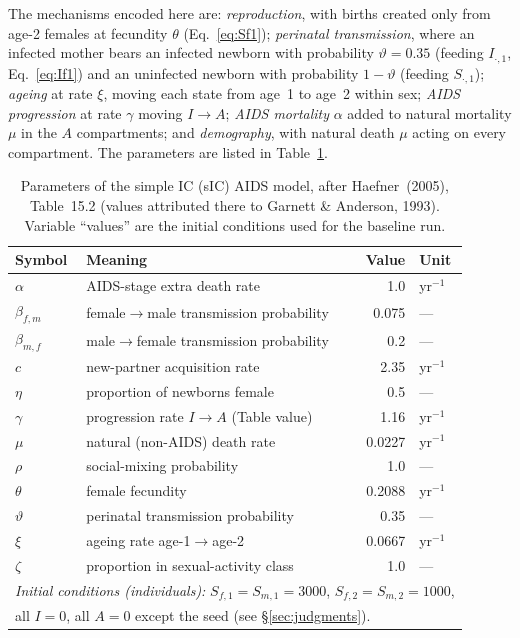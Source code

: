 The mechanisms encoded here are: \emph{reproduction}, with births created only from
age-2 females at fecundity $\theta$ (Eq.~\ref{eq:Sf1}); \emph{perinatal
transmission}, where an infected mother bears an infected newborn with probability
$\vartheta=0.35$ (feeding $I_{\cdot,1}$, Eq.~\ref{eq:If1}) and an uninfected
newborn with probability $1-\vartheta$ (feeding $S_{\cdot,1}$); \emph{ageing} at
rate $\xi$, moving each state from age~1 to age~2 within sex; \emph{AIDS
progression} at rate $\gamma$ moving $I\to A$; \emph{AIDS mortality} $\alpha$ added
to natural mortality $\mu$ in the $A$ compartments; and \emph{demography}, with
natural death $\mu$ acting on every compartment. The parameters are listed in
Table~\ref{tab:sic-params}.

\begin{table}[t]
\centering
\caption{Parameters of the simple IC (sIC) AIDS model, after Haefner~(2005),
Table~15.2 (values attributed there to Garnett \& Anderson, 1993). Variable
``values'' are the initial conditions used for the baseline run.}
\label{tab:sic-params}
\begin{tabular}{llrl}
\toprule
Symbol & Meaning & {Value} & Unit \\
\midrule
$\alpha$        & AIDS-stage extra death rate                 & 1.0    & yr$^{-1}$ \\
$\beta_{f,m}$   & female$\to$male transmission probability    & 0.075  & --- \\
$\beta_{m,f}$   & male$\to$female transmission probability     & 0.2    & --- \\
$c$             & new-partner acquisition rate                 & 2.35   & yr$^{-1}$ \\
$\eta$          & proportion of newborns female                & 0.5    & --- \\
$\gamma$        & progression rate $I\to A$ (Table value)      & 1.16   & yr$^{-1}$ \\
$\mu$           & natural (non-AIDS) death rate                & 0.0227 & yr$^{-1}$ \\
$\rho$          & social-mixing probability                    & 1.0    & --- \\
$\theta$        & female fecundity                             & 0.2088 & yr$^{-1}$ \\
$\vartheta$     & perinatal transmission probability           & 0.35   & --- \\
$\xi$           & ageing rate age-1$\to$age-2                   & 0.0667 & yr$^{-1}$ \\
$\zeta$         & proportion in sexual-activity class          & 1.0    & --- \\
\midrule
\multicolumn{4}{l}{\emph{Initial conditions (individuals):}
  $S_{f,1}=S_{m,1}=3000$, $S_{f,2}=S_{m,2}=1000$,} \\
\multicolumn{4}{l}{\quad all $I=0$, all $A=0$ except the seed (see
  \S\ref{sec:judgments}).} \\
\bottomrule
\end{tabular}
\end{table}

